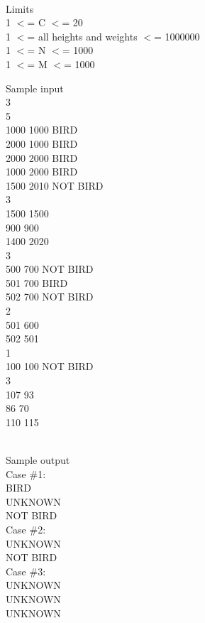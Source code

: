\\   Limits   
\\   1 $<$= C $<$= 20   
\\   1 $<$= all heights and weights $<$= 1000000   
\\   1 $<$= N $<$= 1000   
\\   1 $<$= M $<$= 1000  

   Sample input   
\\   3   
\\   5   
\\   1000 1000 BIRD   
\\   2000 1000 BIRD   
\\   2000 2000 BIRD   
\\   1000 2000 BIRD   
\\   1500 2010 NOT BIRD   
\\   3   
\\   1500 1500   
\\   900 900   
\\   1400 2020   
\\   3   
\\   500 700 NOT BIRD   
\\   501 700 BIRD   
\\   502 700 NOT BIRD   
\\   2   
\\   501 600   
\\   502 501   
\\   1   
\\   100 100 NOT BIRD   
\\   3   
\\   107 93   
\\   86 70   
\\   110 115  


\\   Sample output   
\\   Case \#1:   
\\   BIRD   
\\   UNKNOWN   
\\   NOT BIRD   
\\   Case \#2:   
\\   UNKNOWN   
\\   NOT BIRD   
\\   Case \#3:   
\\   UNKNOWN   
\\   UNKNOWN   
\\   UNKNOWN  